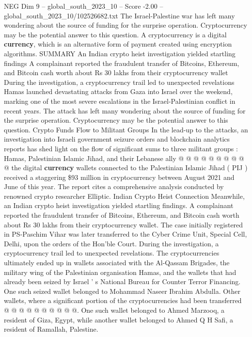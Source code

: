 \begin{textsample}{NEG Dim 9 – global\_south\_2023\_10 – Score -2.00 – global\_south\_2023\_10/102526682.txt}  \label{ex:f9_neg_425}
The Israel-Palestine war has left many wondering about the source of funding for the surprise operation.
Cryptocurrency may be the potential answer to this question.
A cryptocurrency is a digital \textbf{currency}, which is an alternative form of payment created using encryption algorithms.
SUMMARY An Indian crypto heist investigation yielded startling findings A complainant reported the fraudulent transfer of Bitcoins, Ethereum, and Bitcoin cash worth about Rs 30 lakhs from their cryptocurrency wallet During the investigation, a cryptocurrency trail led to unexpected revelations Hamas launched devastating attacks from Gaza into Israel over the weekend, marking one of the most severe escalations in the Israel-Palestinian conflict in recent years.
The attack has left many wondering about the source of funding for the surprise operation.
Cryptocurrency may be the potential answer to this question.
Crypto Funds Flow to Militant Groups In the lead-up to the attacks, an investigation into Israeli government seizure orders and blockchain analytics reports has shed light on the flow of significant sums to three militant groups : Hamas, Palestinian Islamic Jihad, and their Lebanese ally @ @ @ @ @ @ @ @ @ @ the digital \textbf{currency} wallets connected to the Palestinian Islamic Jihad ( PIJ ) received a staggering \$93 million in cryptocurrency between August 2021 and June of this year.
The report cites a comprehensive analysis conducted by renowned crypto researcher Elliptic.
Indian Crypto Heist Connection Meanwhile, an Indian crypto heist investigation yielded startling findings.
A complainant reported the fraudulent transfer of Bitcoins, Ethereum, and Bitcoin cash worth about Rs 30 lakhs from their cryptocurrency wallet.
The case initially registered in PS-Paschim Vihar was later transferred to the Cyber Crime Unit, Special Cell, Delhi, upon the orders of the Hon'ble Court.
During the investigation, a cryptocurrency trail led to unexpected revelations.
The cryptocurrencies ultimately ended up in wallets associated with the Al-Qassam Brigades, the military wing of the Palestinian organisation Hamas, and the wallets that had already been seized by Israel ' s National Bureau for Counter Terror Financing.
One such seized wallet belonged to Mohammad Naseer Ibrahim Abdulla.
Other wallets, where a significant portion of the cryptocurrencies had been transferred @ @ @ @ @ @ @ @ @ @.
One such wallet belonged to Ahmed Marzooq, a resident of Giza, Egypt, while another wallet belonged to Ahmed Q H Safi, a resident of Ramallah, Palestine.

\end{textsample}
